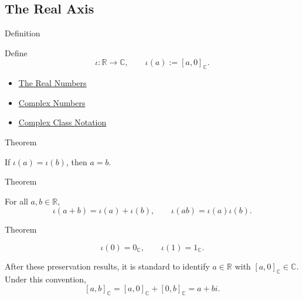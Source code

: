 \subsection*{The Real Axis}

\begin{definitionbox}{Definition}
\begin{definition}
\label{def:canonical-embedding-r-into-c}
Define
\[
\iota:\mathbb{R}\to\mathbb{C},
\qquad
\iota(a):=[a,0]_{\mathbb{C}}.
\]
\end{definition}
\end{definitionbox}

\begin{dependencies}
\begin{itemize}
  \item \hyperref[def:reals]{The Real Numbers}
  \item \hyperref[def:complex-numbers]{Complex Numbers}
  \item \hyperref[def:complex-class-notation]{Complex Class Notation}
\end{itemize}
\end{dependencies}

\begin{theorembox}{Theorem}
\begin{theorem}
\label{thm:embedding-r-into-c-injective}
If \(\iota(a)=\iota(b)\), then \(a=b\).
\end{theorem}
\end{theorembox}

\begin{theorembox}{Theorem}
\begin{theorem}
\label{thm:embedding-r-into-c-preserves-operations}
For all \(a,b\in\mathbb{R}\),
\[
\iota(a+b)=\iota(a)+\iota(b),
\qquad
\iota(ab)=\iota(a)\iota(b).
\]
\end{theorem}
\end{theorembox}

\begin{theorembox}{Theorem}
\begin{theorem}
\label{thm:embedding-r-into-c-preserves-zero-one}
\[
\iota(0)=0_{\mathbb{C}},
\qquad
\iota(1)=1_{\mathbb{C}}.
\]
\end{theorem}
\end{theorembox}

\begin{remark*}[Identification]
After these preservation results, it is standard to identify \(a\in\mathbb{R}\)
with \([a,0]_{\mathbb{C}}\in\mathbb{C}\). Under this convention,
\[
[a,b]_{\mathbb{C}}=[a,0]_{\mathbb{C}}+[0,b]_{\mathbb{C}}
=a+bi.
\]
\end{remark*}

